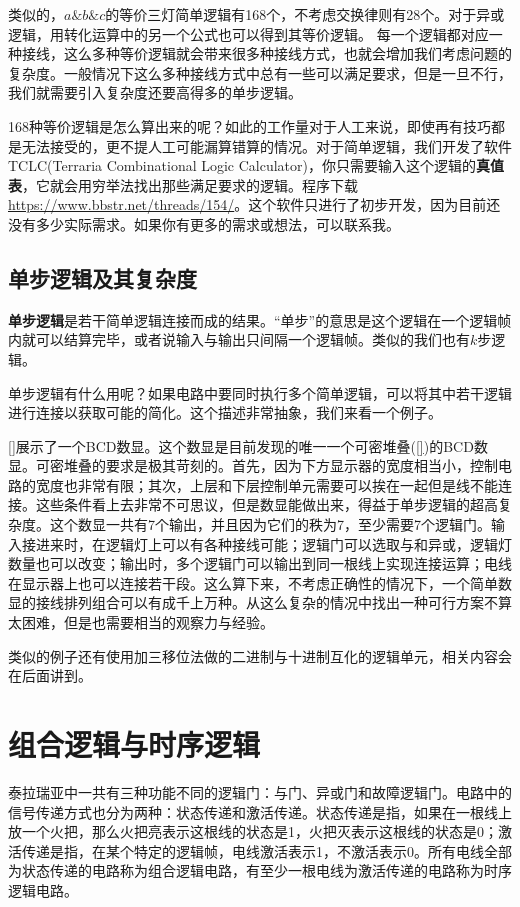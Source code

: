 类似的，$a\&b\&c$的等价三灯简单逻辑有168个，不考虑交换律则有28个。对于异或逻辑，用转化运算中的另一个公式也可以得到其等价逻辑。
每一个逻辑都对应一种接线，这么多种等价逻辑就会带来很多种接线方式，也就会增加我们考虑问题的复杂度。一般情况下这么多种接线方式中总有一些可以满足要求，但是一旦不行，我们就需要引入复杂度还要高得多的单步逻辑。

168种等价逻辑是怎么算出来的呢？如此的工作量对于人工来说，即使再有技巧都是无法接受的，更不提人工可能漏算错算的情况。对于简单逻辑，我们开发了软件TCLC(Terraria Combinational Logic Calculator)，你只需要输入这个逻辑的\textbf{真值表}，它就会用穷举法找出那些满足要求的逻辑。程序下载\url{https://www.bbstr.net/threads/154/}。这个软件只进行了初步开发，因为目前还没有多少实际需求。如果你有更多的需求或想法，可以联系我。

\subsection{单步逻辑及其复杂度}
\textbf{单步逻辑}是若干简单逻辑连接而成的结果。“单步”的意思是这个逻辑在一个逻辑帧内就可以结算完毕，或者说输入与输出只间隔一个逻辑帧。类似的我们也有$k$步逻辑。

单步逻辑有什么用呢？如果电路中要同时执行多个简单逻辑，可以将其中若干逻辑进行连接以获取可能的简化。这个描述非常抽象，我们来看一个例子。

\autoref{}展示了一个BCD数显。这个数显是目前发现的唯一一个可密堆叠(\autoref{})的BCD数显。可密堆叠的要求是极其苛刻的。首先，因为下方显示器的宽度相当小，控制电路的宽度也非常有限；其次，上层和下层控制单元需要可以挨在一起但是线不能连接。这些条件看上去非常不可思议，但是数显能做出来，得益于单步逻辑的超高复杂度。这个数显一共有7个输出，并且因为它们的秩为7，至少需要7个逻辑门。输入接进来时，在逻辑灯上可以有各种接线可能；逻辑门可以选取与和异或，逻辑灯数量也可以改变；输出时，多个逻辑门可以输出到同一根线上实现连接运算；电线在显示器上也可以连接若干段。这么算下来，不考虑正确性的情况下，一个简单数显的接线排列组合可以有成千上万种。从这么复杂的情况中找出一种可行方案不算太困难，但是也需要相当的观察力与经验。

类似的例子还有使用加三移位法做的二进制与十进制互化的逻辑单元，相关内容会在后面讲到。

\section{组合逻辑与时序逻辑}
泰拉瑞亚中一共有三种功能不同的逻辑门：与门、异或门和故障逻辑门。电路中的信号传递方式也分为两种：状态传递和激活传递。状态传递是指，如果在一根线上放一个火把，那么火把亮表示这根线的状态是1，火把灭表示这根线的状态是0；激活传递是指，在某个特定的逻辑帧，电线激活表示1，不激活表示0。所有电线全部为状态传递的电路称为组合逻辑电路，有至少一根电线为激活传递的电路称为时序逻辑电路。

